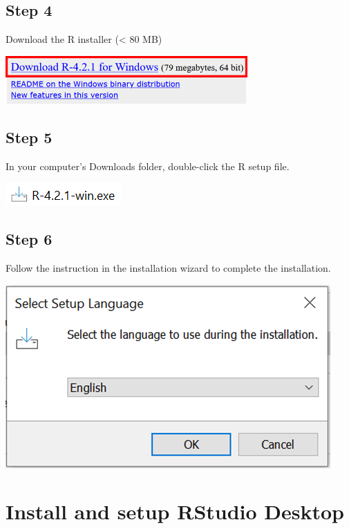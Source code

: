 \documentclass[
  letterpaper,
  DIV=11,
  numbers=noendperiod,
  oneside]{scrreprt}
\begin{document}
\subsection{Step 4}

Download the R installer (\textless{} 80 MB)

\includegraphics[width=3.64583in,height=\textheight]{images/paste-9624855F.png}

\subsection{Step 5}

In your computer's Downloads folder, double-click the R setup file.

\includegraphics{images/paste-FD7C97A4.png}

\subsection{Step 6}

Follow the instruction in the installation wizard to complete the
installation.

\includegraphics{images/paste-0F242DBF.png}

\hypertarget{sec-RStudio-installation}{%
\section{Install and setup RStudio
Desktop}\label{sec-RStudio-installation}}
\end{document}
